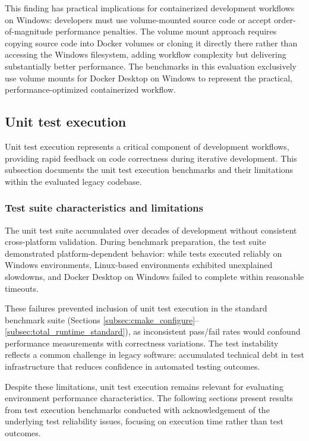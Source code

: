 This finding has practical implications for containerized development workflows on Windows: developers must use volume-mounted source code or accept order-of-magnitude performance penalties.
The volume mount approach requires copying source code into Docker volumes or cloning it directly there rather than accessing the Windows filesystem, adding workflow complexity but delivering substantially better performance.
The benchmarks in this evaluation exclusively use volume mounts for Docker Desktop on Windows to represent the practical, performance-optimized containerized workflow.

\subsection{Unit test execution}
\label{subsec:unittest_execution}

Unit test execution represents a critical component of development workflows, providing rapid feedback on code correctness during iterative development.
This subsection documents the unit test execution benchmarks and their limitations within the evaluated legacy codebase.

\subsubsection{Test suite characteristics and limitations}

The unit test suite accumulated over decades of development without consistent cross-platform validation.
During benchmark preparation, the test suite demonstrated platform-dependent behavior: while tests executed reliably on Windows environments, Linux-based environments exhibited unexplained slowdowns, and Docker Desktop on Windows failed to complete within reasonable timeouts.

These failures prevented inclusion of unit test execution in the standard benchmark suite (Sections \ref{subsec:cmake_configure}--\ref{subsec:total_runtime_standard}), as inconsistent pass/fail rates would confound performance measurements with correctness variations.
The test instability reflects a common challenge in legacy software: accumulated technical debt in test infrastructure that reduces confidence in automated testing outcomes.

Despite these limitations, unit test execution remains relevant for evaluating environment performance characteristics.
The following sections present results from test execution benchmarks conducted with acknowledgement of the underlying test reliability issues, focusing on execution time rather than test outcomes.

